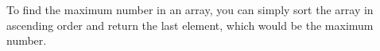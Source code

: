 \documentclass[preview]{standalone}
\begin{document}
To find the maximum number in an array, you can simply sort the array in ascending order and return the last element, which would be the maximum number.\\
\end{document}
